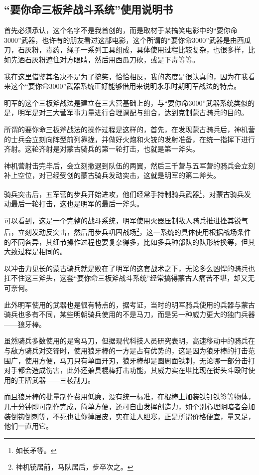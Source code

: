 \begin{multicols}{\theparacolNo}
\subsection{“要你命三板斧战斗系统”使用说明书}
首先必须承认，这个名字不是我首创的，而是取材于某搞笑电影中的“要你命3000”武器，也许有的朋友看过这部电影，这个所谓的“要你命3000”武器是由西瓜刀，石灰粉，毒药，绳子一系列工具组成，具体使用过程比较复杂，也很多样，比如先洒石灰粉遮住对方眼睛，然后用西瓜刀砍，或是下毒等等。

我在这里借鉴其名决不是为了搞笑，恰恰相反，我的态度是很认真的，因为在我看来这个“要你命3000”武器系统正好能够借用来说明永乐时期明军战法的特点。

明军的这个三板斧战法是建立在三大营基础上的，与“要你命3000”武器系统类似的是，明军是对三大营军事力量进行合理调配与组合，达到克制蒙古骑兵的目的。

所谓的要你命三板斧战法的操作过程是这样的，首先，在发现蒙古骑兵后，神机营的士兵会立刻向阵型前列靠拢，并做好火炮和火铳的发射准备，在统一指挥下进行齐射。这轮齐射是对蒙古骑兵的第一轮打击，也就是第一斧头。

神机营射击完毕后，会立刻撤退到队伍的两翼，然后三千营与五军营的骑兵会立刻补上空位，对已经受创的蒙古骑兵发动突击，这就是明军的第二斧头。

骑兵突击后，五军营的步兵开始进攻，他们经常手持制骑兵武器\footnote{如长矛等。}，对蒙古骑兵发动最后一轮打击，这也是明军的最后一斧头。

可以看到，这是一个完整的战斗系统，明军使用火器压制敌人骑兵推进挫其锐气后，立刻发动反突击，然后用步兵巩固战场\footnote{神机铳居前，马队居后，步卒次之。}，这一系统的具体使用根据战场条件的不同各异，其细节操作过程也要复杂得多，比如多兵种部队的队形转换等，但其大致过程是相同的。

以冲击力见长的蒙古骑兵就是败在了明军的这套战术之下，无论多么凶悍的骑兵也扛不住这三斧头，这套“要你命三板斧战斗系统”经常搞得蒙古人痛苦不堪，却又无可奈何。

此外明军使用的武器也是很有特点的，据考证，当时的明军骑兵使用的兵器与蒙古骑兵也多有不同，某些明朝骑兵使用的不是马刀，而是另一种威力更大的独门兵器——狼牙棒。

虽然骑兵多数使用的是弯马刀，但据现代科技人员研究表明，高速移动中的骑兵在与敌方骑兵对交锋时，使用狼牙棒的一方是占有优势的，这是因为狼牙棒的打击范围广，使用方便，马刀只有单面开刃，狼牙棒却是圆周面铁刺，无论哪一部分击打对手都会造成伤害，此外还兼具棍棒打击功能，其威力实在堪比现在街头斗殴时使用的王牌武器——三棱刮刀。

而且狼牙棒的批量制作费用低廉，没有统一标准，在棍棒上加装铁钉铁签等物体，几十分钟即可制作完成，简单方便，还可自由发挥创造力，如个别心理阴暗者会加装倒钩倒刺等，不死也让你掉层皮，实在让人胆寒，正是所谓价格便宜，量又足，他们一直用它。


\end{multicols}

